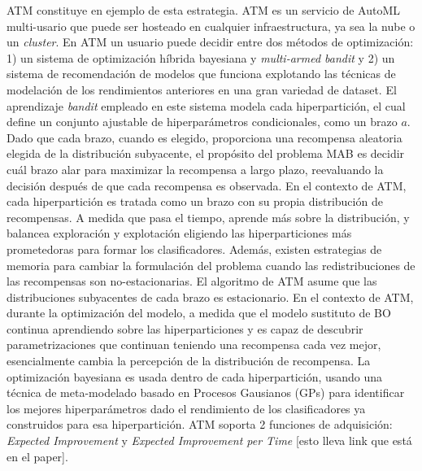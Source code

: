 ATM \cite{swearingen2017atm} constituye en ejemplo de esta estrategia. ATM es un servicio de AutoML multi-usario que puede ser hosteado en cualquier infraestructura, ya sea la nube o un \textit{cluster}. En ATM un usuario puede decidir entre dos métodos de optimización: 1) un sistema de optimización híbrida bayesiana y \textit{multi-armed bandit} y 2) un sistema de recomendación de modelos que funciona explotando las técnicas de modelación de los rendimientos anteriores en una gran variedad de dataset. El aprendizaje \textit{bandit} empleado en este sistema modela cada hiperpartición, el cual define un conjunto ajustable de hiperparámetros condicionales, como un brazo $a$. Dado que cada brazo, cuando es elegido, proporciona una recompensa aleatoria elegida de la distribución subyacente, el propósito del problema MAB es decidir cuál brazo alar para maximizar la recompensa a largo plazo, reevaluando la decisión después de que cada recompensa es observada. En el contexto de ATM, cada hiperpartición es tratada como un brazo con su propia distribución de recompensas. A medida que pasa el tiempo, aprende más sobre la distribución, y balancea exploración y explotación eligiendo las hiperparticiones más prometedoras para formar los clasificadores. Además, existen estrategias de memoria para cambiar la formulación del problema cuando las redistribuciones de las recompensas son no-estacionarias. El algoritmo de ATM asume que las distribuciones subyacentes de cada brazo es estacionario. En el contexto de ATM, durante la optimización del modelo, a medida que el modelo sustituto de BO continua aprendiendo sobre las hiperparticiones y es capaz de descubrir parametrizaciones que continuan teniendo una recompensa cada vez mejor, esencialmente cambia la percepción de la distribución de recompensa. La optimización bayesiana es usada dentro de cada hiperpartición, usando una técnica de meta-modelado basado en Procesos Gausianos (GPs) para identificar los mejores hiperparámetros dado el rendimiento de los clasificadores ya construidos para esa hiperpartición. ATM soporta 2 funciones de adquisición: \textit{Expected Improvement} y \textit{Expected Improvement per Time} [esto lleva link que está en el paper].

